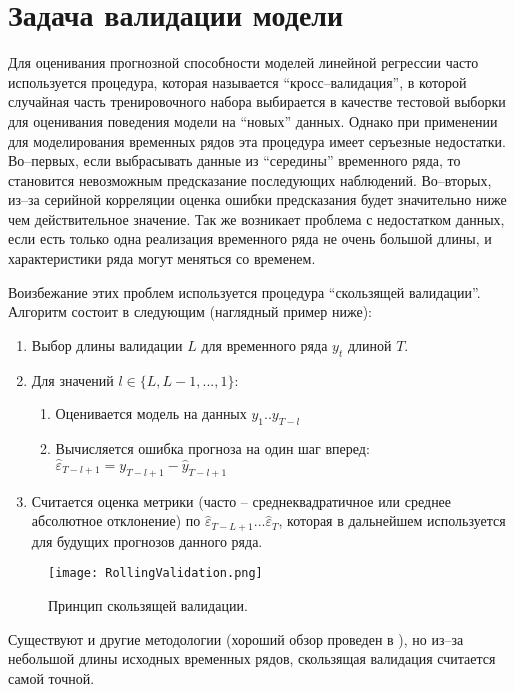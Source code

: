 \documentclass[../report.tex]{subfiles}
\begin{document}
	\section{Задача валидации модели}
	
	Для оценивания прогнозной способности моделей линейной регрессии часто используется процедура, которая называется ``кросс–валидация'', в которой случайная часть тренировочного набора выбирается в качестве тестовой выборки для оценивания поведения модели на ``новых'' данных. Однако при применении для моделирования временных рядов эта процедура имеет серъезные недостатки. Во–первых, если выбрасывать данные из ``середины'' временного ряда, то становится невозможным предсказание последующих наблюдений. Во–вторых, из–за серийной корреляции оценка ошибки предсказания будет значительно ниже чем действительное значение. Так же возникает проблема с недостатком данных, если есть только одна реализация временного ряда не очень большой длины, и характеристики ряда могут меняться со временем.
	
	Воизбежание этих проблем используется процедура ``скользящей валидации''. Алгоритм состоит в следующим (наглядный пример ниже):
	\begin{enumerate}
		\item Выбор длины валидации $L$ для временного ряда  $y_t$ длиной $T$.
		\item Для значений $l \in \{L, L-1, ..., 1\}$:
		\begin{enumerate}
			\item Оценивается модель на данных $y_1..y_{T-l}$
			\item Вычисляется ошибка прогноза на один шаг вперед: 
			$\hat{\varepsilon}_{T-l+1} = y_{T-l+1} - \hat{y}_{T-l+1}$
		\end{enumerate}
		\item Считается оценка метрики (часто – среднеквадратичное или среднее абсолютное отклонение) по $\hat{\varepsilon}_{T-L+1} ... \hat{\varepsilon}_{T}$, которая в дальнейшем используется для будущих прогнозов данного ряда.
	\end{enumerate}
	
	\begin{figure}
		\texttt{[image: RollingValidation.png]}
		\caption{Принцип скользящей валидации.}
		\label{fig:rolling_validation}
	\end{figure}
	
	Существуют и другие методологии (хороший обзор проведен в \cite{hyndCV}), но из–за небольшой длины исходных временных рядов, скользящая валидация считается самой точной.
	
\end{document}
